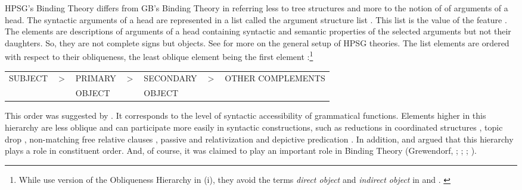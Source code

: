 \documentclass[output=paper,biblatex,babelshorthands,newtxmath,draftmode,colorlinks,citecolor=brown]{langscibook}
\begin{document}
HPSG's Binding Theory differs from GB's Binding Theory in referring less to tree structures and
more to the notion of  of arguments of a head. The syntactic arguments of a head are represented
in a list called the argument structure list . This list is the value of the feature \argst. The
\argst elements are descriptions of arguments of a head containing syntactic and semantic properties
of the selected arguments but not their daughters. So, they are not complete signs but 
objects. See  for more on the general setup of HPSG
theories. The list elements are ordered with respect to their obliqueness, the least oblique element
being the first element \citep[]{PS92a}:\footnote{
  While \citet[]{ps} use  version of the Obliqueness Hierarchy in (i), they avoid the
  terms \emph{direct object} and \emph{indirect object} in  and
  .
\ea
\label{def-obliqueness-hierarchy-ps87}
\z
}
\ea
\label{def-obliqueness-hierarchy}
%
\begin{tabular}[t]{@{}l@{~~}l@{~~}l@{~~}l@{~~}l@{~~}l@{~~}l@{}}
SUBJECT & $>$ & PRIMARY & $>$ & SECONDARY  &  $>$ & OTHER COMPLEMENTS\\
        &     & OBJECT  &     & OBJECT     &      &\\
\end{tabular}%
\z
This order was suggested by \citet[]{KC77a}. It corresponds to the level of syntactic accessibility of grammatical functions. Elements
higher in this hierarchy are less oblique and can participate more easily in syntactic constructions, such as 
reductions in coordinated structures \citep[]{Klein85},
topic drop \citep{Fries88b},
non-matching free relative clauses 
\parencites[Section~3]{Bausewein90}[]{Pittner95b}[--62]{Mueller99b}, 
passive and relativization \citep[, 68]{KC77a} and
depictive predication \citep[Section~2]{Mueller2008a}.
In addition, \citet{Pullum77a} and \citet[]{ps} argued that this hierarchy plays a role in
constituent order.
And, of course, it was claimed to play an important role in Binding Theory 
(Grewendorf, \citeyear[]{Grewendorf83a}; \citeyear[]{Grewendorf85a}; \citeyear[]{Grewendorf88a}; \citealp[Chapter~6]{ps2}).
\end{document}

